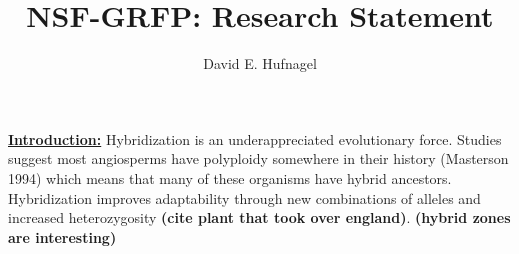 \documentclass[12pt]{amsart}
\title{NSF-GRFP: Research Statement}
\author{David E. Hufnagel}
\newcommand{\mbh}[1]{\textcolor{red}{ \emph{\scriptsize  #1}} }
\begin{document}
\maketitle

\textbf{\underline{Introduction:} }
Hybridization is an underappreciated evolutionary force.
Studies suggest most angiosperms have polyploidy somewhere in their history (Masterson 1994) which means that many of these organisms have hybrid ancestors. %
Hybridization improves adaptability through new combinations of alleles and increased heterozygosity \textbf{(cite plant that took over england)}. \textbf{(hybrid zones are interesting)}
\end{document}
